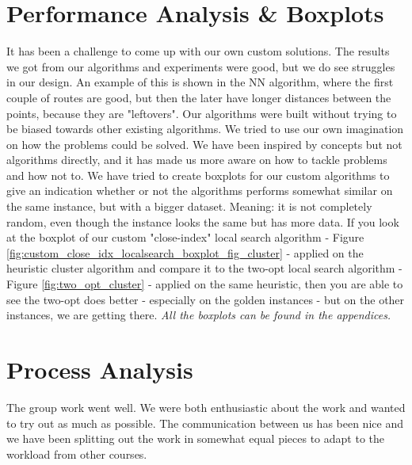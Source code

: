 \documentclass[12pt]{article}
\begin{document}
\section{Performance Analysis \& Boxplots}
It has been a challenge to come up with our own custom solutions. The results we got from our algorithms and experiments
were good, but we do see struggles in our design. An example of this is shown in the NN algorithm, where the first couple of routes are good, but then the later have longer distances between the points, because they are "leftovers". 
\newline
Our algorithms were built without trying to be biased towards other existing algorithms. We tried to use our own imagination on how the problems could be solved. 
We have been inspired by concepts but not algorithms directly, and it has made us more aware on how to tackle problems and how not to.
\newline
We have tried to create boxplots for our custom algorithms to give an indication whether or not the algorithms performs somewhat similar on the same instance, but with 
a bigger dataset. Meaning: it is not completely random, even though the instance looks the same but has more data. If you look at the boxplot of our custom "close-index" local search algorithm - Figure \ref{fig:custom_close_idx_localsearch_boxplot_fig_cluster} - applied on the heuristic cluster algorithm
and compare it to the two-opt local search algorithm - Figure \ref{fig:two_opt_cluster} - applied on the same heuristic, then you are able to see the two-opt does better - especially on the golden instances - but on the other instances, we are getting there. 
\newline 
\textit{All the boxplots can be found in the appendices.}
\newline



\section{Process Analysis}
The group work went well. We were both enthusiastic about the work and wanted to try out as much as possible. 
The communication between us has been nice and we have been splitting out the work in somewhat equal pieces to adapt to the workload from other courses.
\end{document}

